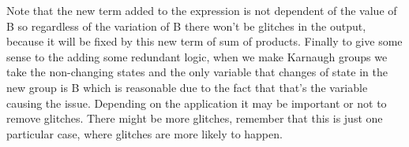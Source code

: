 \documentclass[a4paper,12pt]{article}
\begin{document}
Note that the new term added to the expression is not dependent
of the value of B so regardless of the variation of B there won't be glitches
in the output, because it will be fixed by this new term of sum of products.
\linebreak
Finally to give some sense to the adding some redundant logic,
when we make Karnaugh groups we take the non-changing states and
the only variable that changes of state in the new group is B
which is reasonable due to the fact that that's the variable 
causing the issue.
Depending on the application it may be important or not to remove
glitches.
There might be more glitches, remember that this is just one particular case,
where glitches are more likely to happen.
\end{document}
